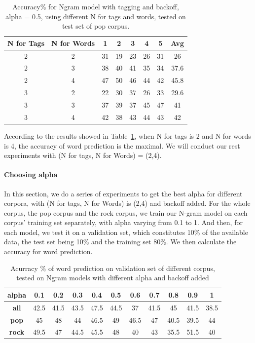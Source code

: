 \documentclass[a4paper,12pt]{article}
\begin{document}
\begin{table}[]
\centering
\begin{tabular}{|c|c|c|c|c|c|c|c|}
\hline
\rowcolor[HTML]{EFEFEF} 
\textbf{N for Tags} & \textbf{N for Words} & \textbf{1} & \textbf{2} & \textbf{3} & \textbf{4} & \textbf{5} & \textbf{Avg} \\ \hline
2 & 2 & 31 & 19 & 23 & 26 & 31 & 26 \\ \hline
2 & 3 & 38 & 40 & 41 & 35 & 34 & 37.6 \\ \hline
2 & 4 & 47 & 50 & 46 & 44 & 42 & 45.8 \\ \hline
3 & 2 & 22 & 30 & 37 & 26 & 33 & 29.6 \\ \hline
3 & 3 & 37 & 39 & 37 & 45 & 47 & 41 \\ \hline
3 & 4 & 42 & 38 & 43 & 44 & 43 & 42 \\ \hline
\end{tabular}
\caption{Accuracy\% for Ngram model with tagging and backoff, alpha = 0.5, using different N for tags and words, tested on test set of pop corpus.}
\label{tab:chooseN}
\end{table}
According to the results showed in Table~\ref{tab:chooseN}, when N for tags is 2 and N for words is 4, the accuracy of word prediction is the maximal. We will conduct our rest experiments with (N for tags, N for Words) = (2,4).

\paragraph{Choosing alpha}
In this section, we do a series of experiments to get the best alpha for different corpora, with (N for tags, N for Words) is (2,4) and backoff added. For the whole corpus, the pop corpus and the rock corpus, we train our N-gram model on each corpus' training set separately, with alpha varying from 0.1 to 1. And then, for each model, we test it on a validation set, which constitutes 10\% of the available data, the test set being 10\% and the training set 80\%. We then calculate the accuracy for word prediction.
\begin{table}[]
\centering
\begin{tabular}{|c|c|c|c|c|c|c|c|c|c|c|}
\hline
\rowcolor[HTML]{EFEFEF} 
\textbf{alpha} & \textbf{0.1} & \textbf{0.2} & \textbf{0.3} & \textbf{0.4} & \textbf{0.5} & \textbf{0.6} & \textbf{0.7} & \textbf{0.8} & \textbf{0.9} & \textbf{1} \\ \hline
\cellcolor[HTML]{EFEFEF}\textbf{all} & 42.5 & 41.5 & 43.5 & \cellcolor[HTML]{EFEFEF}47.5 & 44.5 & 37 & 41.5 & 45 & 41.5 & 38.5 \\ \hline
\cellcolor[HTML]{EFEFEF}\textbf{pop} & 45 & 48 & 44 & 46.5 & \cellcolor[HTML]{EFEFEF}49 & 46.5 & 47 & 40.5 & 39.5 & 44 \\ \hline
\cellcolor[HTML]{EFEFEF}\textbf{rock} & 49.5 & 47 & 44.5 & 45.5 & 48 & 40 & 43 & 35.5 & \cellcolor[HTML]{EFEFEF}51.5 & 40 \\ \hline
\end{tabular}
\caption{Acurracy \% of word prediction on validation set of different corpus, tested on Ngram models with different alpha and backoff added}
\label{tab:alpha}
\end{table}
\end{document}
